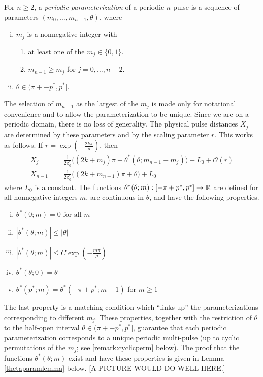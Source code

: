 \documentclass[thesis.tex]{subfiles}
\begin{document}
\begin{definition}\label{def:perparam}
For $n \geq 2$, a \emph{periodic parameterization} of a periodic $n$-pulse is a sequence of parameters $(m_0, \dots, m_{n-1}, \theta)$, where
\begin{enumerate}[(i)]
\item $m_j$ is a nonnegative integer with
\begin{enumerate}
\item at least one of the $m_j \in \{0, 1\}$.
\item $m_{n-1} \geq m_j$ for $j = 0, \dots, n-2$.
\end{enumerate}
\item $\theta \in (\pi + -p^*, p^*]$.
\end{enumerate}
\end{definition}
The selection of $m_{n-1}$ as the largest of the $m_j$ is made only for notational convenience and to allow the parameterization to be unique. Since we are on a periodic domain, there is no loss of generality. The physical pulse distances $X_j$ are determined by these parameters and by the scaling parameter $r$. This works as follows. If $r = \exp\left(-\frac{2 k \pi}{\rho}\right)$, then
\begin{align*}
X_j &= \frac{1}{2 \beta_0}\big( (2 k + m_j)\pi + \theta^*(\theta; m_{n-1} - m_j)\big) + L_0 + \mathcal{O}(r) \\
X_{n-1} &= \frac{1}{2 \beta_0}\big( (2 k + m_{n-1})\pi + \theta \big) + L_0
\end{align*}
where $L_0$ is a constant. The functions $\theta^*(\theta; m): [-\pi + p^*, p^*] \rightarrow \mathbb{R}$ are defined for all nonnegative integers $m$, are continuous in $\theta$, and have the following properties.
\begin{enumerate}[(i)]
\item $\theta^*(0; m) = 0 \text{ for all } m$
\item $|\theta^*(\theta; m)| \leq |\theta|$
\item $|\theta^*(\theta; m)| \leq C \exp\left(-\frac{m \pi}{\rho} \right)$
\item $\theta^*(\theta; 0) = \theta $
\item $\theta^*(p^*; m) = \theta^*(-\pi+p^*; m+1)$ for $m \geq 1$
\end{enumerate}
The last property is a matching condition which ``links up'' the parameterizations corresponding to different $m_j$. These properties, together with the restriction of $\theta$ to the half-open interval $\theta \in (\pi + -p^*, p^*]$, guarantee that each periodic parameterization corresponds to a unique periodic multi-pulse (up to cyclic permutations of the $m_j$; see \cref{remark:cyclicperm} below). The proof that the functions $\theta^*(\theta; m)$ exist and have these properties is given in Lemma \ref{thetaparamlemma} below. [A PICTURE WOULD DO WELL HERE.]
\end{document}
